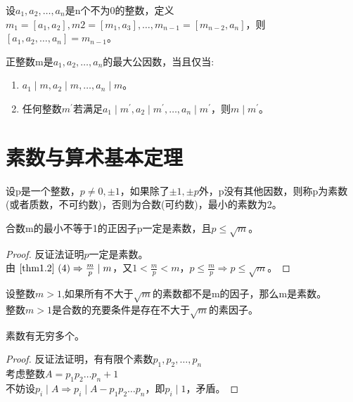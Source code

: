 \documentclass[cn,10pt]{elegantbook}
\begin{document}
\begin{theorem}
  设$a_1,a_2,\dots , a_n$是n个不为0的整数，定义$m_1 = [a_1,a_2],m2 = [m_1,a_3],\dots , m_{n-1} = [m_{n-2},a_n]$，则$[a_1,a_2,\dots , a_n]= m_{n-1}$。
\end{theorem}
\begin{theorem}
  正整数m是$a_1,a_2,\dots,a_n$的最大公因数，当且仅当:
  \begin{enumerate}[(1)]
    \item $ a_1 \mid m, a_2 \mid m, \dots ,a_n \mid m$。
    \item 任何整数$m^{\prime}$若满足$a_1 \mid m^{\prime}, a_2 \mid m^{\prime}, \dots ,a_n \mid m^{\prime}$，则$m \mid m^{\prime}$。
  \end{enumerate}
\end{theorem}

\section{素数与算术基本定理}
\begin{definition}
  设p是一个整数，$p \neq 0, \pm 1$，如果除了$\pm 1, \pm p$外，p没有其他因数，则称p为素数(或者质数，不可约数)，否则为合数(可约数)，最小的素数为2。
\end{definition}
\begin{theorem}
  合数m的最小不等于1的正因子p一定是素数，且$p \leq \sqrt{m}$。
\end{theorem}
\begin{proof}
  反证法证明$p$一定是素数。\\
  由 $ \ref{thm1.2}\ (4) \Rightarrow \frac{m}{p} \mid m$，又$1<\frac{m}{p} <m$，$p \leq \frac{m}{p} \Rightarrow p \leq \sqrt{m}$。
\end{proof}

\begin{conclusion}
  设整数$m>1$,如果所有不大于$\sqrt{m}$的素数都不是m的因子，那么m是素数。\\
  整数$m>1$是合数的充要条件是存在不大于$\sqrt{m}$的素因子。
\end{conclusion}

\begin{theorem}
  素数有无穷多个。
\end{theorem}
\begin{proof}
  反证法证明，有有限个素数$p_1,p_2,\dots , p_n$\\
  考虑整数$A = p_1p_2 \dots p_n +1$\\
  不妨设$p_i \mid A \Rightarrow p_i \mid A -p_1p_2\dots p_n$，即$p_i \mid 1$，矛盾。
\end{proof}
\end{document}
